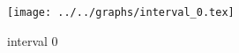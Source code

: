 \begin{figure}[h] \centering\texttt{[image: ../../graphs/interval\_0.tex]}\caption{interval 0}\label{gr:interval_0} \end{figure}
